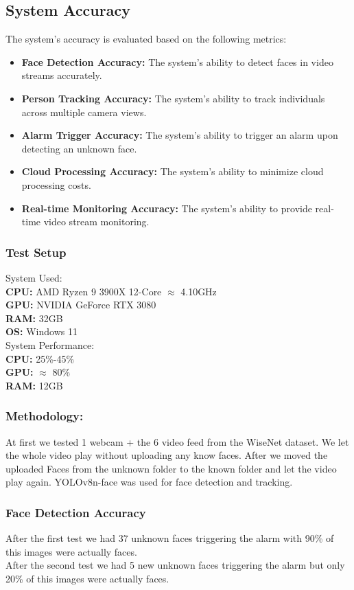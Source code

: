 \documentclass[conference]{IEEEtran}
\begin{document}
\subsection{System Accuracy}
The system's accuracy is evaluated based on the following metrics:
\begin{itemize}
      \item \textbf{Face Detection Accuracy:} The system's ability to detect faces in video streams accurately.
      \item \textbf{Person Tracking Accuracy:} The system's ability to track individuals across multiple camera views.
      \item \textbf{Alarm Trigger Accuracy:} The system's ability to trigger an alarm upon detecting an unknown face.
      \item \textbf{Cloud Processing Accuracy:} The system's ability to minimize cloud processing costs.
      \item \textbf{Real-time Monitoring Accuracy:} The system's ability to provide real-time video stream monitoring. 
\end{itemize}

\subsubsection{Test Setup}

System Used:\\
\textbf{CPU:} AMD Ryzen 9 3900X 12-Core $\approx$ 4.10GHz\\
\textbf{GPU:} NVIDIA GeForce RTX 3080\\
\textbf{RAM:} 32GB\\
\textbf{OS:} Windows 11\\
System Performance:\\
\textbf{CPU:} 25\%-45\%\\
\textbf{GPU:} $\approx$ 80\%\\
\textbf{RAM:} 12GB
\subsubsection{Methodology:}
At first we tested 1 webcam + the 6 video feed from the WiseNet dataset. We let the whole video play without uploading any know faces.
After we moved the uploaded Faces from the unknown folder to the known folder and let the video play again.
YOLOv8n-face was used for face detection and tracking.
\subsubsection{Face Detection Accuracy}
After the first test we had 37 unknown faces triggering the alarm with 90\% of this images were actually faces.\\
After the second test we had 5 new unknown faces triggering the alarm but only 20\% of this images were actually faces.\\
\end{document}
